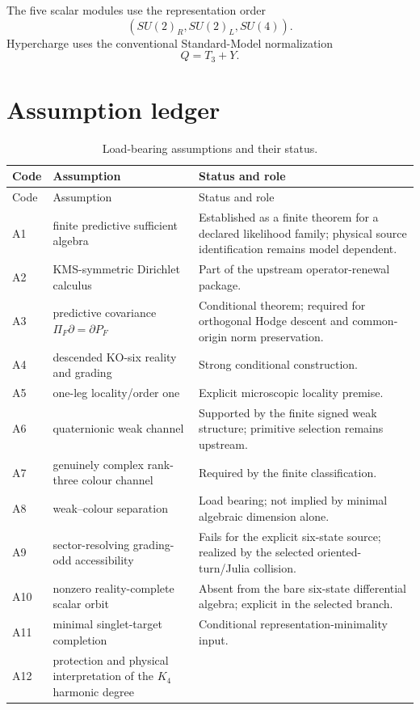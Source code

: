 \documentclass[11pt,oneside,openany]{book}
\numberwithin{equation}{chapter}
\theoremstyle{definition}
\theoremstyle{remark}
\begin{document}
The five scalar modules use the representation order
\[
 (SU(2)_R,SU(2)_L,SU(4)).
\]
Hypercharge uses the conventional Standard-Model normalization
\[
 Q=T_3+Y.
\]

\chapter{Assumption ledger}
\label{app:assumptions}

\begin{longtable}{@{}p{}p{}p{}@{}}
\caption{Load-bearing assumptions and their status.}\\
\toprule
Code & Assumption & Status and role\\
\midrule
\endfirsthead
\toprule
Code & Assumption & Status and role\\
\midrule
\endhead
A1
& finite predictive sufficient algebra
& Established as a finite theorem for a declared likelihood family; physical
  source identification remains model dependent.\\
A2
& KMS-symmetric Dirichlet calculus
& Part of the upstream operator-renewal package.\\
A3
& predictive covariance
  \(\Pi_F\partial=\partial P_F\)
& Conditional theorem; required for orthogonal Hodge descent and common-origin
  norm preservation.\\
A4
& descended KO-six reality and grading
& Strong conditional construction.\\
A5
& one-leg locality/order one
& Explicit microscopic locality premise.\\
A6
& quaternionic weak channel
& Supported by the finite signed weak structure; primitive selection remains
  upstream.\\
A7
& genuinely complex rank-three colour channel
& Required by the finite classification.\\
A8
& weak--colour separation
& Load bearing; not implied by minimal algebraic dimension alone.\\
A9
& sector-resolving grading-odd accessibility
& Fails for the explicit six-state source; realized by the selected
  oriented-turn/Julia collision.\\
A10
& nonzero reality-complete scalar orbit
& Absent from the bare six-state differential algebra; explicit in the
  selected branch.\\
A11
& minimal singlet-target completion
& Conditional representation-minimality input.\\
A12
& protection and physical interpretation of the \(K_4\) harmonic degree

\end{longtable}
\end{document}
